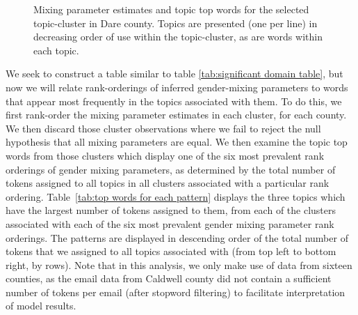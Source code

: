 \documentclass{pnastwo}
\begin{document}
\begin{article}
\begin{figure}
\begin{tabular}{m{}}
	\end{tabular}
	\caption{\label{tab: hoke 3 mp} Mixing parameter estimates and topic top words for the selected topic-cluster in Dare county. Topics are presented (one per line) in decreasing order of use within the topic-cluster, as are words within each topic.}
\end{figure}

We seek to construct a table similar to table \ref{tab:significant domain table}, but now we will relate rank-orderings of inferred gender-mixing parameters to words that appear most frequently in the topics associated with them. To do this, we first rank-order the mixing parameter estimates in each cluster, for each county. We then discard those cluster observations where we fail to reject the null hypothesis that all mixing parameters are equal. We then examine the topic top words from those clusters which display one of the six most prevalent rank orderings of gender mixing parameters, as determined by the total number of tokens assigned to all topics in all clusters associated with a particular rank ordering. Table~\ref{tab:top words for each pattern} displays the three topics which have the largest number of tokens assigned to them, from each of the clusters associated with each of the six most prevalent gender mixing parameter rank orderings. The patterns are displayed in descending order of the total number of tokens that we assigned to all topics associated with (from top left to bottom right, by rows). Note that in this analysis, we only make use of data from sixteen counties, as the email data from Caldwell county did not contain a sufficient number of tokens per email (after stopword filtering) to facilitate interpretation of model results.  


\end{article}
\end{document}
